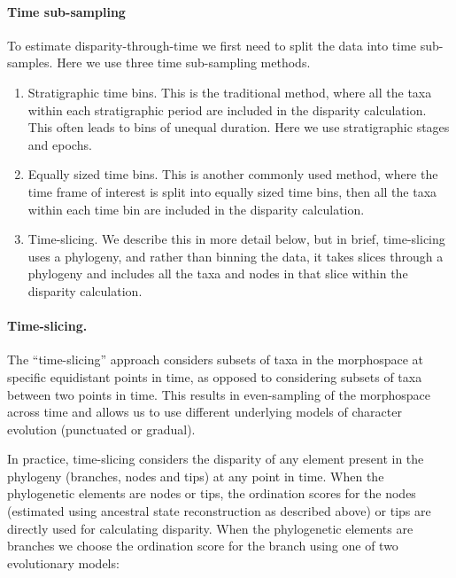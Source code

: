 \documentclass[12pt,a4paper]{article}
\begin{document}
\paragraph{Time sub-sampling} 
\label{time_sub-samples}

To estimate disparity-through-time we first need to split the data into time sub-samples.
Here we use three time sub-sampling methods.

\begin{enumerate}
  \item Stratigraphic time bins. This is the traditional method, where all the taxa within each stratigraphic period are included in the disparity calculation. This often leads to bins of unequal duration. Here we use stratigraphic stages and epochs.
  \item Equally sized time bins. This is another commonly used method, where the time frame of interest is split into equally sized time bins, then all the taxa within each time bin are included in the disparity calculation. 
  \item Time-slicing. We describe this in more detail below, but in brief, time-slicing uses a phylogeny, and rather than binning the data, it takes slices through a phylogeny and includes all the taxa and nodes in that slice within the disparity calculation. 
\end{enumerate}  

\paragraph{Time-slicing.} 
\label{time_slicing}
The ``time-slicing'' approach considers subsets of taxa in the morphospace at specific equidistant points in time, as opposed to considering subsets of taxa between two points in time.
This results in even-sampling of the morphospace across time and allows us to use different underlying models of character evolution (punctuated or gradual). 


In practice, time-slicing considers the disparity of any element present in the phylogeny (branches, nodes and tips) at any point in time.
When the phylogenetic elements are nodes or tips, the ordination scores for the nodes (estimated using ancestral state reconstruction as described above) or tips are directly used for calculating disparity.
When the phylogenetic elements are branches we choose the ordination score for the branch using one of two evolutionary models:
\end{document}
